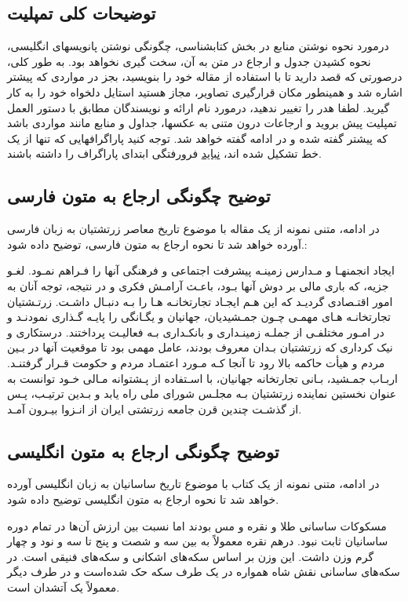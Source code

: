 \documentclass[twoside]{article}
\newcommand{\عنوان}{عنوان ارائه}
\newcommand{\نام}{نام و نام خانوادگی}
\newcommand{\رشته}{رشته}
\newcommand{\دانشگاه}{دانشگاه}
\newcommand{\همکار}{نام و نام خانوادگی همکار}
\begin{document}
\subsection{توضیحات کلی تمپلیت}
درمورد نحوه نوشتن منابع در بخش کتابشناسی، چگونگی نوشتن پانویسهای انگلیسی، نحوه کشیدن جدول و ارجاع در متن به آن، سخت گیری نخواهد بود. به طور کلی، درصورتی که قصد دارید تا با استفاده از \lr{\LaTeX} مقاله خود را بنویسید، بجز در مواردی که پیشتر اشاره شد و همینطور مکان قرارگیری تصاویر، مجاز هستید استایل دلخواه خود را به کار گیرید. لطفا هدر را تغییر ندهید، درمورد نام ارائه و نویسندگان مطابق با دستور العمل تمپلیت پیش بروید و ارجاعات درون متنی به عکسها، جداول و منابع مانند مواردی باشد که پیشتر گفته شده و در ادامه گفته خواهد شد. توجه کنید پاراگرافهایی که تنها از یک خط تشکیل شده اند، \underline{نباید} فرورفتگی ابتدای پاراگراف را داشته باشند.
\subsection{توضیح چگونگی ارجاع به متون فارسی}
\noindent در ادامه، متنی نمونه از یک مقاله با موضوع تاریخ معاصر زرتشتیان به زبان فارسی آورده خواهد شد تا نحوه ارجاع به متون فارسی، توضیح داده شود.:

ایجاد انجمنهـا و مـدارس زمینـه پیشرفت اجتماعی و فرهنگی آنها را فـراهم نمـود. لغـو جزیه، که باری مالی بر دوش آنها بـود، باعـث آرامـش فکری و در نتیجه، توجه آنان به امور اقتـصادی گردیـد که این هـم ایجـاد تجارتخانـه هـا را بـه دنبـال داشـت.  زرتـشتیان تجارتخانـه هـای مهمـی چـون جمـشیدیان، جهانیان و یگـانگی را پایـه گـذاری نمودنـد و در امـور مختلفـی از جملـه زمینـداری و بانکـداری بـه فعالیـت پرداختند. درستکاری و نیک کرداری که زرتشتیان بـدان معروف بودند، عامل مهمی بود تا موقعیت آنها در بـین مردم و هیأت حاکمه بالا رود تا آنجا کـه مـورد اعتمـاد مردم و حکومت قـرار گرفتنـد. اربـاب جمـشید، بـانی تجارتخانه جهانیان، با اسـتفاده از پـشتوانه مـالی خـود توانست به عنوان نخستین نماینده زرتشتیان بـه مجلـس شورای ملی راه یابد و بـدین ترتیـب، پـس از گذشـت چندین قرن جامعه زرتشتی ایران از انـزوا بیـرون آمـد. \cite{اوشیدری}

\subsection{توضیح چگونگی ارجاع به متون انگلیسی}
\noindent در ادامه، متنی نمونه از یک کتاب با موضوع تاریخ ساسانیان به زبان انگلیسی آورده خواهد شد تا نحوه ارجاع به متون انگلیسی توضیح داده شود.

مسکوکات ساسانی طلا و نقره و مس بودند اما نسبت بین ارزش آن‌ها در تمام دوره ساسانیان ثابت نبود. درهم نقره معمولاً به بین سه و شصت و پنج تا سه و نود و چهار گرم وزن داشت. این وزن بر اساس سکه‌های اشکانی و سکه‌های فنیقی است. در سکه‌های ساسانی نقش شاه همواره در یک طرف سکه حک شده‌است و در طرف دیگر معمولاً یک آتشدان است. \cite{Daryaee}
\end{document}
